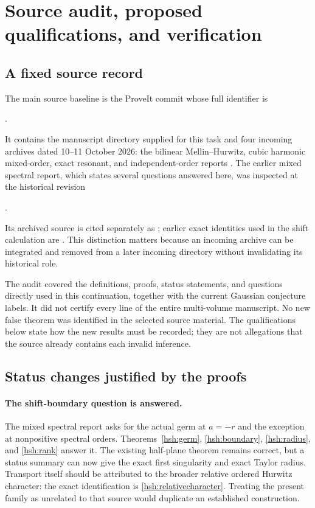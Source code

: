 \section{Source audit, proposed qualifications, and verification}
\label{sec:audit}

\subsection{A fixed source record}

The main source baseline is the ProveIt commit whose full identifier is
\begin{center}
\small{}.
\end{center}
It contains the manuscript directory supplied for this task and four
incoming archives dated 10--11 October 2026: the bilinear
Mellin--Hurwitz, cubic harmonic mixed-order, exact resonant, and
independent-order reports \cite{RepoMain,RepoBilinear,RepoCubic,
RepoExactResonant,RepoIndependent}. The earlier mixed spectral report,
which states several questions answered here, was inspected at the
historical revision
\begin{center}
\small{}.
\end{center}
Its archived source is cited separately as \cite{RepoMixed}; earlier
exact identities used in the shift calculation are \cite{RepoExact}.
This distinction matters because an incoming archive can be integrated
and removed from a later incoming directory without invalidating its
historical role.

The audit covered the definitions, proofs, status statements, and
questions directly used in this continuation, together with the current
Gaussian conjecture labels. It did not certify every line of the entire
multi-volume manuscript. No new false theorem was identified in the
selected source material. The qualifications below state how the new
results must be recorded; they are not allegations that the source
already contains each invalid inference.

\subsection{Status changes justified by the proofs}

\paragraph{The shift-boundary question is answered.}
The mixed spectral report asks for the actual germ at $a=-r$ and the
exception at nonpositive spectral orders. Theorems~\ref{hsh:germ},
\ref{hsh:boundary}, \ref{hsh:radius}, and \ref{hsh:rank} answer it.
The existing half-plane theorem remains correct, but a status summary
can now give the exact first singularity and exact Taylor radius.
Transport itself should be attributed to the broader relative ordered
Hurwitz character: the exact identification is
\eqref{hsh:relativecharacter}. Treating the present family as unrelated
to that source would duplicate an established construction.

